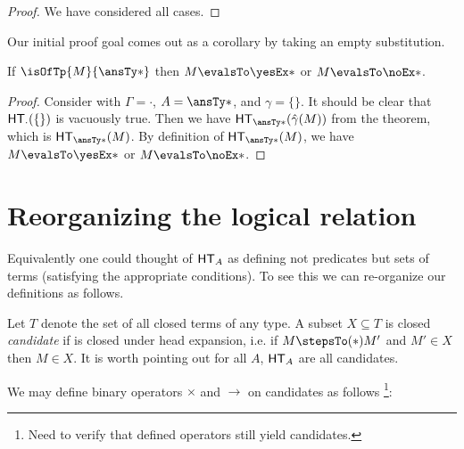 \documentclass[letterpaper]{article}
\begin{document}
\begin{proof}
We have considered all cases.
\end{proof}

Our initial proof goal comes out as a corollary by taking an empty substitution.
\begin{corollary}
  If $\isOfTp{M}{\ansTy*}$ then $M \evalsTo \yesEx*$ or $M \evalsTo \noEx*$.
\end{corollary}
\begin{proof}
  Consider  with $\Gamma = \cdot$, $A = \ansTy*$, and $\gamma = \{\}$. It should be clear that $\HT[\cdot](\{\})$ is vacuously true. Then we have $\HT[\ansTy*](\hat{\gamma}(M))$ from the theorem, which is $\HT[\ansTy*](M)$. By definition of $\HT[\ansTy*](M)$, we have $M \evalsTo \yesEx*$ or $M \evalsTo \noEx*$.
\end{proof}

\section{Reorganizing the logical relation}

Equivalently one could thought of $\HT[A]$ as defining not predicates but sets of terms
(satisfying the appropriate conditions). To see this we can re-organize our definitions
as follows.

Let $T$ denote the set of all closed terms of any type.
A subset $X \subseteq T$ is closed \emph{candidate} if is closed under head expansion,
i.e. if $M \stepsTo(*) M'$ and $M' \in X$ then $M \in X$.
It is worth pointing out for all $A$, $\HT[A]$ are all candidates.

We may define binary operators $\times$ and $\rightarrow$ on candidates as follows
\footnote{Need to verify that defined operators still yield candidates.}:
\end{document}
